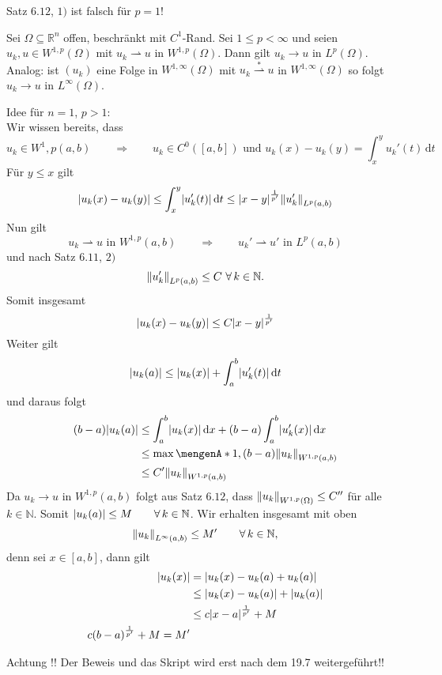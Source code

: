 \begin{bemerkung}
	Satz $6.12$, $1)$ ist falsch für $p=1$!
\end{bemerkung}
\begin{satz}[Rellich]
	Sei $\Omega \subseteq \mathbb{R}^n$ offen, beschränkt mit $C^1$-Rand. Sei $1 \leq p < \infty$ und seien $u_k,u \in W^{1,p}(\Omega)$ mit $u_k \rightharpoonup u$ in $W^{1,p}(\Omega)$. Dann gilt $u_k \to u$ in $L^p(\Omega)$. \\
	Analog: ist $(u_k)$ eine Folge in $W^{1,\infty}(\Omega)$ mit $u_k \stackrel{*}{\rightharpoonup}u $ in $W^{1,\infty}(\Omega)$ so folgt $u_k \to u$ in $L^{\infty}(\Omega)$.
\end{satz}
\begin{beweis}
	Idee für $n=1$, $p>1$: \\
	Wir wissen bereits, dass
	\[
		u_k \in W^1,p(a,b) \qquad \Rightarrow \qquad u_k \in C^0([a,b]) \text{ und } u_k(x)-u_k(y) = \int_{x}^{y} u_k'(t) \,\mathrm{d}t
	\]
	Für $y \leq x$ gilt
	\[
		\abs{u_k(x)-u_k(y)} \leq \int_{x}^{y}\abs{u_k'(t)} \,\mathrm{d}t \leq \abs{x-y}^{\frac{1}{p'}}\norm{u'_k}_{L^p(a,b)}
	\]
	Nun gilt
	\[
		u_k \rightharpoonup u \text{ in } W^{1,p}(a,b) \qquad \Rightarrow \qquad u_k' \rightharpoonup u' \text{ in }L^p(a,b) 
	\]
	und nach Satz $6.11$, $2)$
	\[
	 \norm{u'_k}_{L^p(a,b)} \leq C \,\,\forall\,  k \in \mathbb{N}.
	\]
	Somit insgesamt
	\[
		\lvert u_k(x)-u_k(y)\rvert \leq C \lvert x-y\rvert^{\frac{1}{p'}}	
	\]
	Weiter gilt
	\[
		\lvert u_k(a)\rvert \leq \lvert u_k(x)\rvert + \int_{a}^{b}\lvert u'_k(t)\rvert \,\mathrm{d}t
	\]
	und daraus folgt
	\begin{align*}
		(b-a)\abs{u_k(a)} &\leq \int_{a}^{b} \abs{u_k(x)} \,\mathrm{d}x + (b-a) \int_{a}^{b} \abs{u_k'(x)} \,\mathrm{d}x \\
		&\leq \max \set{1,(b-a)} \norm{u_k}_{W^{1,p}(a,b)} \\
		&\leq C' \norm{u_k}_{W^{1,p}(a,b)} 
	\end{align*}
	Da $u_k \to u$ in $W^{1,p}(a,b)$ folgt aus Satz $6.12$, dass $\norm{u_k}_{W^{1,p}(\Omega)} \leq C''$ für alle $k \in \mathbb{N}$. Somit
	$\lvert u_k(a)\rvert \leq M \qquad \forall\, k \in \mathbb{N}$. Wir erhalten insgesamt mit oben
	\[
		\norm{u_k}_{L^\infty(a,b)} \leq M' \qquad \forall\, k \in \mathbb{N},
	\]
	denn sei $x \in [a,b]$, dann gilt
	\begin{align*}
		\lvert u_k(x)\rvert &= \lvert u_k(x)-u_k(a) + u_k(a)\rvert \\
		&\leq \lvert u_k(x)- u_k(a)\rvert+ \lvert u_k(a)\rvert \\
		&\leq c \lvert x-a\rvert^{\frac{1}{p'}} + M \\
		c (b-a)^{\frac{1}{p'}}+ M = M'
	\end{align*}
	
\begin{centering}
	\begin{Large}
		Achtung !! Der Beweis und das Skript wird erst nach dem 19.7 weitergeführt!! 
	\end{Large}
\end{centering}
	
\end{beweis}
\cleardoubleoddemptypage
{}
\setcounter{page}{1}

